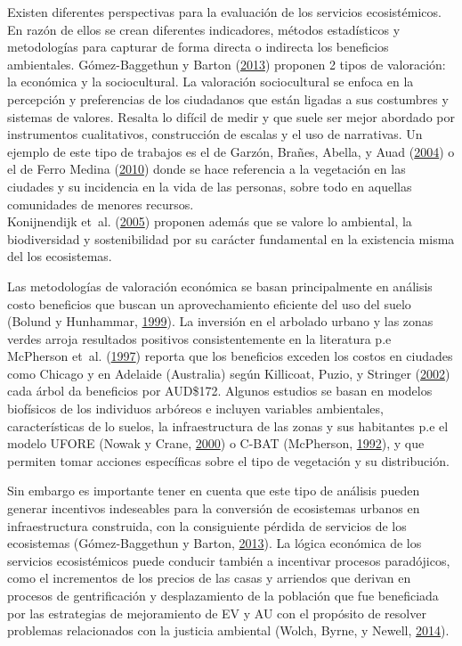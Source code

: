 \documentclass[12pt,a4paper,openany]{book}
\theoremstyle{definition}
\theoremstyle{definition}
\theoremstyle{definition}
\theoremstyle{remark}
\begin{document}
Existen diferentes perspectivas para la evaluación de los servicios
ecosistémicos. En razón de ellos se crean diferentes indicadores,
métodos estadísticos y metodologías para capturar de forma directa o
indirecta los beneficios ambientales. Gómez-Baggethun y Barton
(\protect\hyperlink{ref-gomez-baggethun_classifying_2013}{2013})
proponen 2 tipos de valoración: la económica y la sociocultural. La
valoración sociocultural se enfoca en la percepción y preferencias de
los ciudadanos que están ligadas a sus costumbres y sistemas de valores.
Resalta lo difícil de medir y que suele ser mejor abordado por
instrumentos cualitativos, construcción de escalas y el uso de
narrativas. Un ejemplo de este tipo de trabajos es el de Garzón, Brañes,
Abella, y Auad (\protect\hyperlink{ref-garzon2004vegetacion}{2004}) o el
de Ferro Medina
(\protect\hyperlink{ref-ferro_medina_arboles_2010}{2010}) donde se hace
referencia a la vegetación en las ciudades y su incidencia en la vida de
las personas, sobre todo en aquellas comunidades de menores recursos.\\
Konijnendijk et~al.
(\protect\hyperlink{ref-konijnendijk_arboles_2005}{2005}) proponen
además que se valore lo ambiental, la biodiversidad y sostenibilidad por
su carácter fundamental en la existencia misma del los ecosistemas.

Las metodologías de valoración económica se basan principalmente en
análisis costo beneficios que buscan un aprovechamiento eficiente del
uso del suelo (Bolund y Hunhammar,
\protect\hyperlink{ref-bolund_ecosystem_1999}{1999}). La inversión en el
arbolado urbano y las zonas verdes arroja resultados positivos
consistentemente en la literatura p.e McPherson et~al.
(\protect\hyperlink{ref-mcpherson_quantifying_1997}{1997}) reporta que
los beneficios exceden los costos en ciudades como Chicago y en Adelaide
(Australia) según Killicoat, Puzio, y Stringer
(\protect\hyperlink{ref-killicoat_economic_2002}{2002}) cada árbol da
beneficios por AUD\$172. Algunos estudios se basan en modelos biofísicos
de los individuos arbóreos e incluyen variables ambientales,
características de lo suelos, la infraestructura de las zonas y sus
habitantes p.e el modelo UFORE (Nowak y Crane,
\protect\hyperlink{ref-nowak_urban_2000}{2000}) o C-BAT (McPherson,
\protect\hyperlink{ref-mcpherson1992accounting}{1992}), y que permiten
tomar acciones específicas sobre el tipo de vegetación y su
distribución.

Sin embargo es importante tener en cuenta que este tipo de análisis
pueden generar incentivos indeseables para la conversión de ecosistemas
urbanos en infraestructura construida, con la consiguiente pérdida de
servicios de los ecosistemas (Gómez-Baggethun y Barton,
\protect\hyperlink{ref-gomez-baggethun_classifying_2013}{2013}). La
lógica económica de los servicios ecosistémicos puede conducir también a
incentivar procesos paradójicos, como el incrementos de los precios de
las casas y arriendos que derivan en procesos de gentrificación y
desplazamiento de la población que fue beneficiada por las estrategias
de mejoramiento de EV y AU con el propósito de resolver problemas
relacionados con la justicia ambiental (Wolch, Byrne, y Newell,
\protect\hyperlink{ref-wolch_urban_2014}{2014}).
\end{document}
